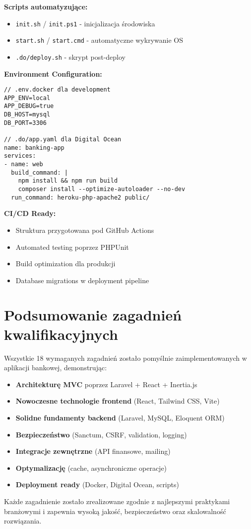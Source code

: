 \textbf{Scripts automatyzujące:}
\begin{itemize}
    \item \texttt{init.sh} / \texttt{init.ps1} - inicjalizacja środowiska
    \item \texttt{start.sh} / \texttt{start.cmd} - automatyczne wykrywanie OS
    \item \texttt{.do/deploy.sh} - skrypt post-deploy
\end{itemize}

\textbf{Environment Configuration:}
\begin{verbatim}
// .env.docker dla development
APP_ENV=local
APP_DEBUG=true
DB_HOST=mysql
DB_PORT=3306

// .do/app.yaml dla Digital Ocean
name: banking-app
services:
- name: web
  build_command: |
    npm install && npm run build
    composer install --optimize-autoloader --no-dev
  run_command: heroku-php-apache2 public/
\end{verbatim}

\textbf{CI/CD Ready:}
\begin{itemize}
    \item Struktura przygotowana pod GitHub Actions
    \item Automated testing poprzez PHPUnit
    \item Build optimization dla produkcji
    \item Database migrations w deployment pipeline
\end{itemize}

\section{Podsumowanie zagadnień kwalifikacyjnych}

Wszystkie 18 wymaganych zagadnień zostało pomyślnie zaimplementowanych w aplikacji bankowej, demonstrując:

\begin{itemize}
    \item \textbf{Architekturę MVC} poprzez Laravel + React + Inertia.js
    \item \textbf{Nowoczesne technologie frontend} (React, Tailwind CSS, Vite)
    \item \textbf{Solidne fundamenty backend} (Laravel, MySQL, Eloquent ORM)
    \item \textbf{Bezpieczeństwo} (Sanctum, CSRF, validation, logging)
    \item \textbf{Integracje zewnętrzne} (API finansowe, mailing)
    \item \textbf{Optymalizację} (cache, asynchroniczne operacje)
    \item \textbf{Deployment ready} (Docker, Digital Ocean, scripts)
\end{itemize}

Każde zagadnienie zostało zrealizowane zgodnie z najlepszymi praktykami branżowymi i zapewnia wysoką jakość, bezpieczeństwo oraz skalowalność rozwiązania.
